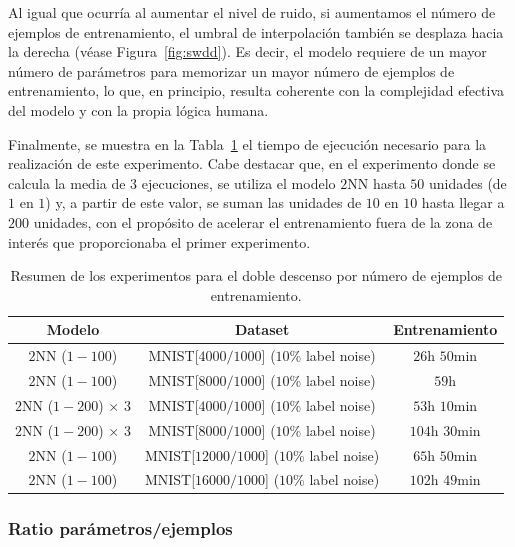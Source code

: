 Al igual que ocurría al aumentar el nivel de ruido, si aumentamos el número de ejemplos de entrenamiento, el umbral de interpolación también se desplaza hacia la derecha (véase Figura~\ref{fig:swdd}). Es decir, el modelo requiere de un mayor número de parámetros para memorizar un mayor número de ejemplos de entrenamiento, lo que, en principio, resulta coherente con la complejidad efectiva del modelo y con la propia lógica humana.

Finalmente, se muestra en la Tabla~\ref{tab:model_training_time} el tiempo de ejecución necesario para la realización de este experimento. Cabe destacar que, en el experimento donde se calcula la media de $3$ ejecuciones, se utiliza el modelo $2$NN hasta $50$ unidades (de $1$ en $1$) y, a partir de este valor, se suman las unidades de $10$ en $10$ hasta llegar a $200$ unidades, con el propósito de acelerar el entrenamiento fuera de la zona de interés que proporcionaba el primer experimento.

\begin{table}[h!]
\centering
\begin{tabular}{|c|c|c|}
\hline
\textbf{Modelo}       & \textbf{Dataset} & \textbf{Entrenamiento} \\ 
\hline
$2$NN ($1-100$)      & MNIST[$4000/1000$] ($10$\% label noise)        & $26$h $50$min       \\ 
$2$NN ($1-100$)      & MNIST[$8000/1000$]  ($10$\% label noise)       & $59$h       \\ 
$2$NN ($1-200$) $\times$ $3$     & MNIST[$4000/1000$]  ($10$\% label noise)       & $53$h $10$min       \\ 
$2$NN ($1-200$) $\times$ $3$      & MNIST[$8000/1000$]  ($10$\% label noise)       & $104$h $30$min       \\ 
$2$NN ($1-100$)          & MNIST[$12000/1000$] ($10$\% label noise)   & $65$h $50$min   \\ 
$2$NN ($1-100$)          & MNIST[$16000/1000$] ($10$\% label noise)   & $102$h $49$min   \\ 
\hline
\end{tabular}
\caption[Resumen de los experimentos para el doble descenso por número de ejemplos de entrenamiento.]{Resumen de los experimentos para el doble descenso por número de ejemplos de entrenamiento.}\label{tab:model_training_time}
\end{table}

\subsubsection{Ratio parámetros/ejemplos}\label{subsubsec:ratio-parametros-ejemplos}

